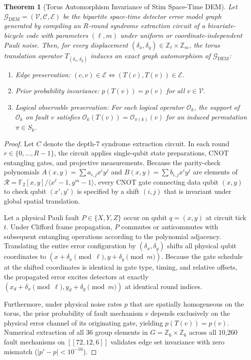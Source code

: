 \documentclass[journal]{IEEEtran}
\newtheorem{theorem}{Theorem}
\begin{document}
\begin{theorem}[Torus Automorphism Invariance of Stim Space-Time DEM]
\label{thm:automorphism}
Let $\mathcal{G}_{\text{DEM}} = (\mathcal{V}, \mathcal{C}, \mathcal{E})$ be the bipartite space-time detector error model graph generated by compiling an $R$-round syndrome extraction circuit of a bivariate-bicycle code with parameters $(\ell, m)$ under uniform or coordinate-independent Pauli noise. Then, for every displacement $(\delta_x, \delta_y) \in \mathbb{Z}_\ell \times \mathbb{Z}_m$, the torus translation operator $T_{(\delta_x, \delta_y)}$ induces an exact graph automorphism of $\mathcal{G}_{\text{DEM}}$:
\begin{enumerate}
    \item Edge preservation: $(c, v) \in \mathcal{E} \iff (T(c), T(v)) \in \mathcal{E}$.
    \item Prior probability invariance: $p(T(v)) = p(v)$ for all $v \in \mathcal{V}$.
    \item Logical observable preservation: For each logical operator $\mathcal{O}_k$, the support of $\mathcal{O}_k$ on fault $v$ satisfies $\mathcal{O}_k(T(v)) = \mathcal{O}_{\pi(k)}(v)$ for an induced permutation $\pi \in S_k$.
\end{enumerate}
\end{theorem}

\begin{proof}
Let $C$ denote the depth-7 syndrome extraction circuit. In each round $r \in \{0, \dots, R-1\}$, the circuit applies single-qubit state preparations, CNOT entangling gates, and projective measurements. Because the parity-check polynomials $A(x, y) = \sum a_{i,j} x^i y^j$ and $B(x, y) = \sum b_{i,j} x^i y^j$ are elements of $\mathcal{R} = \mathbb{F}_2[x, y] / \langle x^\ell - 1, y^m - 1 \rangle$, every CNOT gate connecting data qubit $(x, y)$ to check qubit $(x', y')$ is specified by a shift $(i, j)$ that is invariant under global spatial translation.

Let a physical Pauli fault $P \in \{X, Y, Z\}$ occur on qubit $q = (x, y)$ at circuit tick $t$. Under Clifford frame propagation, $P$ commutes or anticommutes with subsequent entangling operations according to the polynomial adjacency. Translating the entire error configuration by $(\delta_x, \delta_y)$ shifts all physical qubit coordinates to $(x + \delta_x \pmod \ell, y + \delta_y \pmod m)$. Because the gate schedule at the shifted coordinates is identical in gate type, timing, and relative offsets, the propagated error excites detectors at exactly $(x_d + \delta_x \pmod \ell, y_d + \delta_y \pmod m)$ at identical round indices.

Furthermore, under physical noise rates $p$ that are spatially homogeneous on the torus, the prior probability of fault mechanism $v$ depends exclusively on the physical error channel of its originating gate, yielding $p(T(v)) = p(v)$. Numerical extraction of all 36 group elements in $G = \mathbb{Z}_6 \times \mathbb{Z}_6$ across all 10,260 fault mechanisms on $[[72,12,6]]$ validates edge set invariance with zero mismatch ($|p' - p| < 10^{-16}$).
\end{proof}
\end{document}
